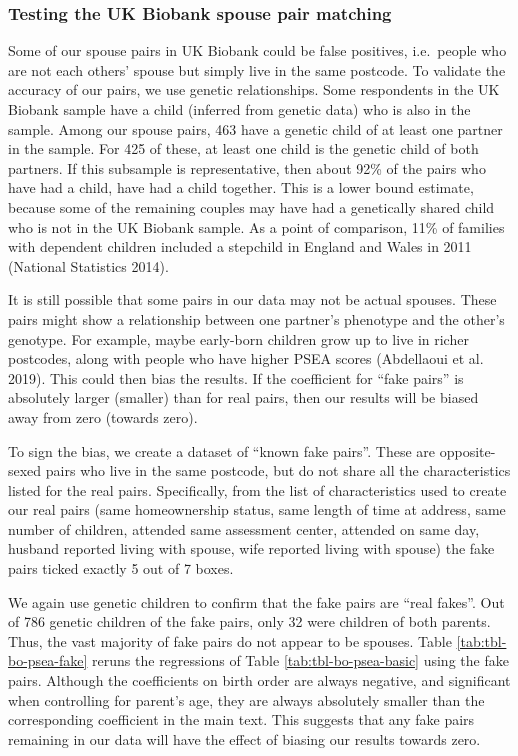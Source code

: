 \documentclass[
  12pt,
]{article}
\theoremstyle{definition}
\theoremstyle{definition}
\theoremstyle{definition}
\theoremstyle{definition}
\theoremstyle{remark}
\begin{document}
\FloatBarrier
\newpage

\hypertarget{testing-the-uk-biobank-spouse-pair-matching}{%
\subsubsection{Testing the UK Biobank spouse pair matching}\label{testing-the-uk-biobank-spouse-pair-matching}}

Some of our spouse pairs in UK Biobank could be false positives, i.e.~people who
are not each others' spouse but simply live in the same postcode. To validate
the accuracy of our pairs, we use genetic relationships. Some respondents in the
UK Biobank sample have a child (inferred from genetic data) who is also in the
sample. Among our spouse pairs, 463 have a genetic child of at
least one partner in the sample. For 425 of these, at least one
child is the genetic child of both partners. If this subsample is
representative, then about 92\% of the
pairs who have had a child, have had a child together. This is a lower bound
estimate, because some of the remaining couples may have had a genetically
shared child who is not in the UK Biobank sample. As a point of comparison, 11\%
of families with dependent children included a stepchild in England and Wales in
2011 (National Statistics 2014).

It is still possible that some pairs in our data may not be actual spouses.
These pairs might show a relationship between one partner's phenotype and the
other's genotype. For example, maybe early-born children grow up to live in
richer postcodes, along with people who have higher PSEA scores
(Abdellaoui et al. 2019). This could then bias the results. If the coefficient
for ``fake pairs'' is absolutely larger (smaller) than for real pairs, then our
results will be biased away from zero (towards zero).

To sign the bias, we create a dataset of ``known fake pairs''. These are
opposite-sexed pairs who live in the same postcode, but do not share all
the characteristics listed for the real pairs. Specifically, from the
list of characteristics used to create our real pairs (same
homeownership status, same length of time at address, same number of
children, attended same assessment center, attended on same day, husband
reported living with spouse, wife reported living with spouse) the fake
pairs ticked exactly 5 out of 7 boxes.

We again use genetic children to confirm that the fake pairs are ``real
fakes''. Out of 786 genetic children of the fake pairs, only
32 were children of both parents. Thus, the vast majority of
fake pairs do not appear to be spouses. Table
\ref{tab:tbl-bo-psea-fake} reruns the regressions of Table
\ref{tab:tbl-bo-psea-basic} using the fake pairs. Although the
coefficients on birth order are always negative, and significant
when controlling for parent's age, they are always absolutely smaller than the
corresponding coefficient in the main text. This suggests that
any fake pairs remaining in our data will have the effect of biasing our
results towards zero.
\end{document}
